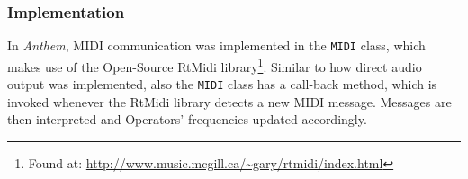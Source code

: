 \subsubsection{Implementation}

In \emph{Anthem}, MIDI communication was implemented in the \texttt{MIDI} class, which makes use of the Open-Source RtMidi library\footnote[3]{Found at: \url{http://www.music.mcgill.ca/~gary/rtmidi/index.html}}. Similar to how direct audio output was implemented, also the \texttt{MIDI} class has a call-back method, which is invoked whenever the RtMidi library detects a new MIDI message. Messages are then interpreted and Operators' frequencies updated accordingly.
